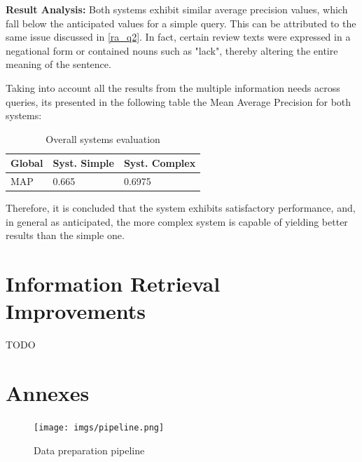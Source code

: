 \documentclass[sigconf]{acmart}
\begin{document}
\textbf{Result Analysis:} Both systems exhibit similar average precision values, which fall below the anticipated values for a simple query. This can be attributed to the same issue discussed in \ref{ra_q2}. In fact, certain review texts were expressed in a negational form or contained nouns such as "lack", thereby altering the entire meaning of the sentence.


Taking into account all the results from the multiple information needs across queries, its presented in the following table the Mean Average Precision for both systems:

\begin{table}[h]
\caption{Overall systems evaluation}
\label{tab:systems_ev}
\begin{tabular}{lll}
\toprule
Global & Syst. Simple & Syst. Complex\\
\midrule
MAP & 0.665 & 0.6975  \\

\bottomrule
\end{tabular}
\end{table}

Therefore, it is concluded that the system exhibits satisfactory performance, and, in general as anticipated, the more complex system is capable of yielding better results than the simple one.

\renewcommand{\thesubsection}{\arabic{section}.\arabic{subsection}}
\section{Information Retrieval Improvements} \label{sec:improvements}

TODO

\nocite{*}
\def\BibTex{BibTeX}


\appendix

\section{Annexes}

\begin{figure}[H]
  \centering
  \texttt{[image: imgs/pipeline.png]}
  \caption{Data preparation pipeline}
  \label{fig:pipeline}
\end{figure}
\end{document}
